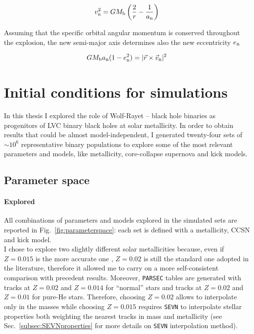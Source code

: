 \documentclass[a4paper,titlepage]{book}     	%
\begin{document}
\begin{equation}\label{eq:neworbitalseparation}
    v_{\rm n}^2 = G M_{\rm b} \left( \frac{2}{r} - \frac{1}{a_{\rm n}} \right)
\end{equation}

Assuming that the specific orbital angular momentum is conserved throughout the explosion, the new semi-major axis determines also the new eccentricity $e_{\rm n}$ 

\begin{equation}\label{eq:neweccentricity}
    G M_{\rm b} a_{\rm n} (1-e_{\rm n}^2) = |\vec{r} \times \vec{v}_{\rm n}|^2
\end{equation}

\section{Initial conditions for simulations}\label{sec:initialconditionsSEVN}
In this thesis I explored the role of Wolf-Rayet -- black hole binaries as progenitors of LVC binary black holes at solar metallicity. In order to obtain results that could be almost model-independent, I generated twenty-four sets of $\sim 10^6$ representative binary populations to explore some of the most relevant parameters and models, like metallicity, core-collapse supernova and kick models. 

\subsection{Parameter space}\label{subsec:parameterspace}
\paragraph{Explored} All combinations of parameters and models explored in the simulated sets are reported in Fig.\ \ref{fig:parameterspace}: each set is defined with a metallicity, CCSN and kick model.\\

I chose to explore two slightly different solar metallicities because, even if $Z=0.015$ is the more accurate one \cite{caffau2011solarmetallicity}, $Z=0.02$ is still the standard one adopted in the literature, therefore it allowed me to carry on a more self-consistent comparison with precedent results. Moreover, \texttt{PARSEC} tables are generated with tracks at $Z=0.02$ and $Z=0.014$ for ``normal'' stars and tracks at $Z=0.02$ and $Z=0.01$ for pure-He stars. Therefore, choosing $Z=0.02$ allows to interpolate only in the masses while choosing $Z=0.015$ requires \texttt{SEVN} to interpolate stellar properties both weighting the nearest tracks in mass and metallicity (see Sec.\ \ref{subsec:SEVNproperties} for more details on \texttt{SEVN} interpolation method).\\
\end{document}
